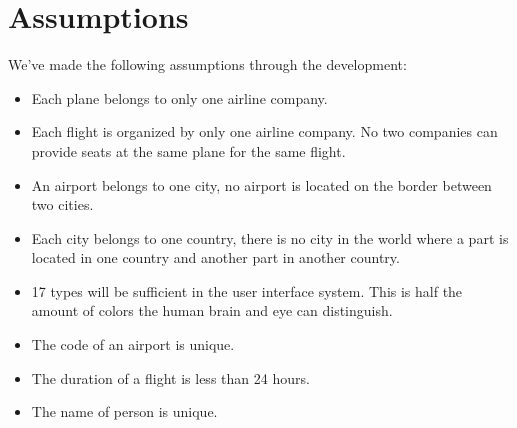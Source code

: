 \section{Assumptions}
We've made the following assumptions through the development:
\begin{itemize}
 \item Each plane belongs to only one airline company.
 \item Each flight is organized by only one airline company. No two companies
can provide seats at the same plane for the same flight.
 \item An airport belongs to one city, no airport is located on the border
between two cities.
 \item Each city belongs to one country, there is no city in the world where a
part is located in one country and another part in another country.
 \item 17 types will be sufficient in the user interface system. This is half
the amount of colors the human brain and eye can distinguish.
\item The code of an airport is unique.
\item The duration of a flight is less than 24 hours.
\item The name of person is unique.
\end{itemize}